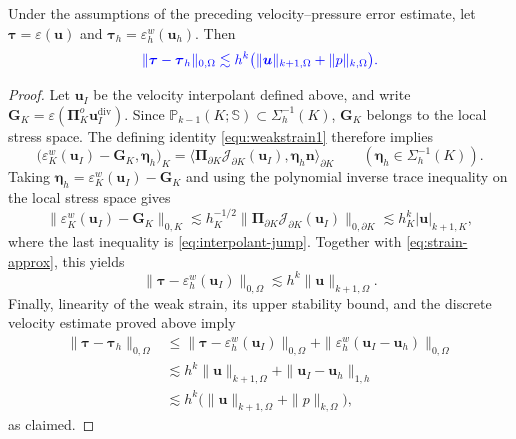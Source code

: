\documentclass[review,hidelinks,onefignum,onetabnum]{siamart251216}
\begin{document}
\begin{theorem}
\label{thm:stress-error}
Under the assumptions of the preceding velocity--pressure error estimate,
let $\boldsymbol\tau=\varepsilon(\boldsymbol u)$ and
$\boldsymbol\tau_h=\varepsilon_h^w(\boldsymbol u_h)$.
Then
\begin{equation}\label{eq:stress-error}
\color{blue}
\|\boldsymbol\tau-\boldsymbol\tau_h\|_{0,\Omega}
\lesssim h^k\bigl(\|\boldsymbol u\|_{k+1,\Omega}
                  +\|p\|_{k,\Omega}\bigr).
\end{equation}
\end{theorem}
\begin{proof}
Let $\boldsymbol u_I$ be the velocity interpolant defined above, and
write $\boldsymbol G_K=\varepsilon(\boldsymbol\Pi_K^o
\boldsymbol u_I^{\operatorname{div}})$.
Since $\mathbb P_{k-1}(K;\mathbb S)\subset\Sigma_h^{-1}(K)$,
$\boldsymbol G_K$ belongs to the local stress space. The defining
identity \eqref{equ:weakstrain1} therefore implies
\[
\bigl(\varepsilon_K^w(\boldsymbol u_I)-\boldsymbol G_K,
\boldsymbol\eta_h\bigr)_K
=\bigl\langle\boldsymbol\Pi_{\partial K}
\mathcal J_{\partial K}(\boldsymbol u_I),
\boldsymbol\eta_h\boldsymbol n\bigr\rangle_{\partial K}
\qquad(\boldsymbol\eta_h\in\Sigma_h^{-1}(K)).
\]
Taking $\boldsymbol\eta_h=\varepsilon_K^w(\boldsymbol u_I)-
\boldsymbol G_K$ and using the polynomial inverse trace inequality
on the local stress space gives
\begin{equation}\label{eq:stress-correction-bound}
\|\varepsilon_K^w(\boldsymbol u_I)-\boldsymbol G_K\|_{0,K}
\lesssim h_K^{-1/2}\|\boldsymbol\Pi_{\partial K}
\mathcal J_{\partial K}(\boldsymbol u_I)\|_{0,\partial K}
\lesssim h_K^k|\boldsymbol u|_{k+1,K},
\end{equation}
where the last inequality is \eqref{eq:interpolant-jump}.
Together with \eqref{eq:strain-approx}, this yields
\begin{equation}\label{eq:stress-interpolation}
\|\boldsymbol\tau-\varepsilon_h^w(\boldsymbol u_I)\|_{0,\Omega}
\lesssim h^k\|\boldsymbol u\|_{k+1,\Omega}.
\end{equation}
Finally, linearity of the weak strain, its upper stability bound,
and the discrete velocity estimate proved above imply
\[
\begin{aligned}
\|\boldsymbol\tau-\boldsymbol\tau_h\|_{0,\Omega}
&\le\|\boldsymbol\tau-\varepsilon_h^w(\boldsymbol u_I)\|_{0,\Omega}
 +\|\varepsilon_h^w(\boldsymbol u_I-\boldsymbol u_h)\|_{0,\Omega}\\
&\lesssim h^k\|\boldsymbol u\|_{k+1,\Omega}
 +\|\boldsymbol u_I-\boldsymbol u_h\|_{1,h}\\
&\lesssim h^k\bigl(\|\boldsymbol u\|_{k+1,\Omega}
 +\|p\|_{k,\Omega}\bigr),
\end{aligned}
\]
as claimed.
\end{proof}
\end{document}
